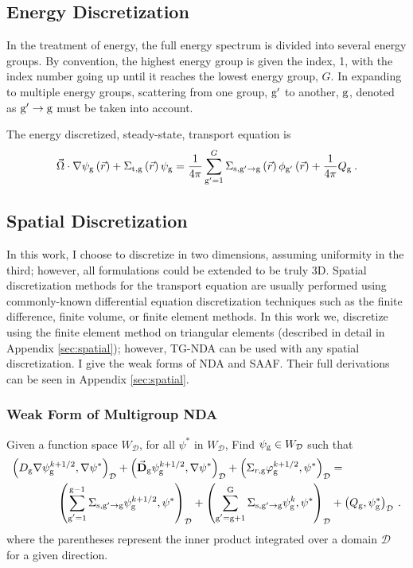 \subsection{Energy Discretization}
In the treatment of energy, the full energy spectrum is divided into several energy groups. By convention, the highest energy group is given the index, 1, with the index number going up until it reaches the lowest energy group, $G$. In expanding to multiple energy groups, scattering from one group, $\mathrm{g}'$ to another, $\mathrm{g}$, denoted as $\mathrm{g}' \rightarrow \mathrm{g} $ must be taken into account. 

The energy discretized, steady-state, transport equation is
%
 \begin{equation}
  \vec{\Omega} \cdot \nabla \psi_{\mathrm{g}} \left(\vec{r}\right)+ \Sigma_{\mathrm{t}, \mathrm{g}}\left(\vec{r}\right)\psi_{\mathrm{g}} = \frac{1}{4 \pi} \sum\limits_{\mathrm{g}'=1}^{G}\Sigma_{\mathrm{s}, \mathrm{g}' \rightarrow \mathrm{g}}\left(\vec{r}\right) \phi_{\mathrm{g}'}\left(\vec{r}\right) + \frac{1}{4 \pi} Q_{\mathrm{g}}\:.
  \label{eq:transport-energy}
 \end{equation}


\subsection{Spatial Discretization}
In this work, I choose to discretize in two dimensions, assuming uniformity in the third; however, all formulations could be extended to be truly 3D. Spatial discretization methods for the transport equation are usually performed using commonly-known differential equation discretization techniques such as the finite difference, finite volume, or finite element methods. In this work we, discretize using the finite element method on triangular elements (described in detail in Appendix \ref{sec:spatial}); however, TG-NDA can be used with any spatial discretization. I give the weak forms of NDA and SAAF. Their full derivations can be seen in Appendix \ref{sec:spatial}. 


\subsubsection{Weak Form of Multigroup NDA}

Given a function space $W_\mathcal{D}$, for all $\psi^*$ in $W_\mathcal{D}$, Find $\psi_{\mathrm{g}} \in W_\mathcal{D}$ such that
%
\begin{equation}
 \begin{split}
  \left(D_{\mathrm{g}} \nabla \psi_{\mathrm{g}}^{k+1/2}, \nabla \psi^*\right)_\mathcal{D} + \left(\vec{\bf{D}}_{\mathrm{g}} \psi_{\mathrm{g}}^{k+1/2} , \nabla \psi^*\right)_\mathcal{D} +  \left(\Sigma_{r,\mathrm{g}} \varphi_{\mathrm{g}}^{k+1/2}, \psi^*\right)_\mathcal{D} &=  \\
   \left(\sum\limits_{\substack{\mathrm{g}'=1}}^{\mathrm{g-1}} \Sigma_{\mathrm{s},\mathrm{g}' \to\mathrm{g}}\psi_{\mathrm{g}}^{k+1/2}, \psi^*\right)_\mathcal{D} + \left(\sum\limits_{\substack{\mathrm{g}'=\mathrm{g}+1}}^{\mathrm{G}} \Sigma_{\mathrm{s},\mathrm{g}' \to\mathrm{g}}\psi_{\mathrm{g}}^{k}, \psi^*\right)_\mathcal{D} 
  &+ \left(Q_{\mathrm{g}}, \psi^*_{\mathrm{g}}\right)_\mathcal{D} \:.
 \end{split}
 \label{k1/2}
\end{equation}
%
where the parentheses represent the inner product integrated over a domain $\mathcal{D}$ for a given direction.

